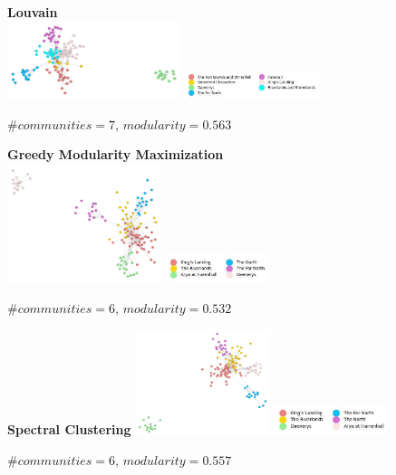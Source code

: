 \documentclass[10pt,twocolumn,letterpaper]{article}
\begin{document}
\begin{figure}[!h]
    \centering
    \centering
    \textbf{Louvain} \\
    \includegraphics[width=0.45\textwidth]{img/s2/communities_louvain.jpg}
    \includegraphics[width=0.35\textwidth]{img/s2/louvain_legend.jpg}\\
    \caption{\small{$\#communities=7$, $modularity=0.563$}}
    \label{fig:louvain_s2}
\end{figure}    

\begin{figure}[!h]
    \centering
    \textbf{Greedy Modularity Maximization}\\
    \includegraphics[width=0.4\textwidth]{img/s2/communities_gmm.jpg}
    \includegraphics[width=0.27\textwidth]{img/s2/gmm_legend.jpg}\\
    \caption{\small{$\#communities=6$, $modularity=0.532$}}
    \label{fig:gmm_s2}
\end{figure}

\begin{figure}[!h]
    \centering
    \textbf{Spectral Clustering}
    \includegraphics[width=0.35\textwidth]{img/s2/communities_sc.jpg}
    \includegraphics[width=0.3\textwidth]{img/s2/sc_legend.jpg}\\
    \caption{\small{$\#communities=6$, $modularity=0.557$}}
    \label{fig:sc_s2}
\end{figure}
\end{document}
